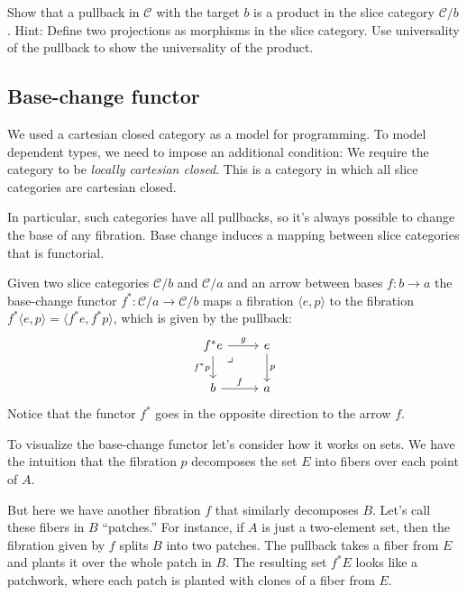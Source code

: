 \documentclass[DaoFP]{subfiles}
\begin{document}
\begin{exercise}
Show that a pullback in $\mathcal{C}$ with the target $b$ is a product in the slice category $\mathcal{C}/b$. Hint: Define two projections  as morphisms in the slice category. Use universality of the pullback to show the universality of the product.
\end{exercise}


\subsection{Base-change functor}

We used a cartesian closed category as a model for programming. To model dependent types, we need to impose an additional condition: We require the category to be \emph{locally cartesian closed}. This is a category in which all slice categories are cartesian closed. 

In particular, such categories have all pullbacks, so it's always possible to change the base of any fibration.  Base change induces a mapping between slice categories that is functorial. 

Given two slice categories $\mathcal{C}/b$ and $\mathcal{C}/a$ and an arrow between bases $f \colon b \to a$ the base-change functor $f^* \colon \mathcal{C}/a \to \mathcal{C}/b$ maps a fibration $\langle e, p \rangle$ to the fibration $ f^* \langle e, p \rangle= \langle f^* e, f^* p \rangle$, which is given by the pullback:
\[
 \begin{tikzcd}
f^* e
\arrow[dr, phantom,  , very near start, "\lrcorner"]
 \arrow[d, "f^*p"']
 \arrow[r, "g"]
 & e
 \arrow[d, "p"]
 \\
 b
 \arrow[r, "f"]
 &a
  \end{tikzcd}
\]
Notice that the functor $f^*$ goes in the opposite direction to the arrow $f$.

To visualize the base-change functor let's consider how it works on sets. We have the intuition that the fibration $p$ decomposes the set $E$ into fibers over each point of $A$. 

But here we have another fibration $f$ that similarly decomposes $B$. Let's call these fibers in $B$ ``patches.'' For instance, if $A$ is just a two-element set, then the fibration given by $f$ splits $B$ into two patches. The pullback takes a fiber from $E$ and plants it over the whole patch in $B$. The resulting set $f^*E$ looks like a patchwork, where each patch is planted with clones of a fiber from $E$.
\end{document}
